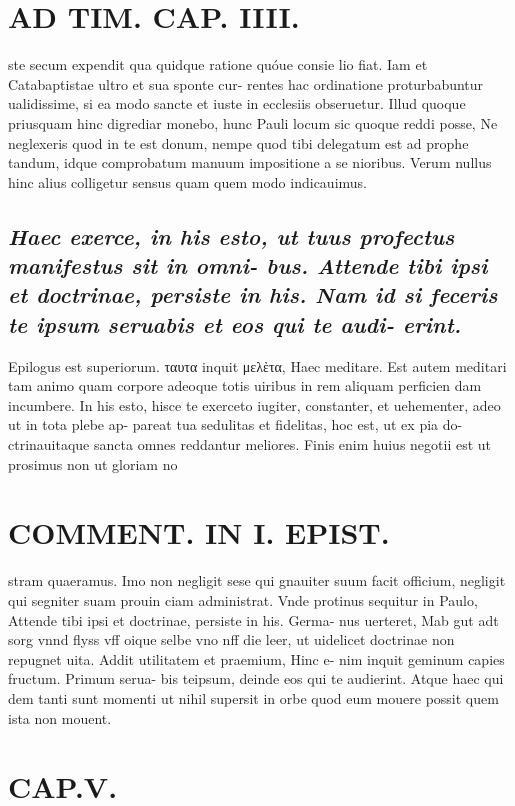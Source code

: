 \documentclass{article}
\begin{document}
\begin{pages}
\section*{AD TIM. CAP. IIII. }
\marginpar{[ p.147 ]}\pstart ste secum expendit qua quidque ratione quóue consie lio fiat. Iam et Catabaptistae ultro et sua sponte cur- rentes hac ordinatione proturbabuntur ualidissime, si ea modo sancte et iuste in ecclesiis obseruetur. Illud quoque priusquam hinc digrediar monebo, hunc Pauli locum sic quoque reddi posse, Ne neglexeris quod in te est donum, nempe quod tibi delegatum est ad prophe tandum, idque comprobatum manuum impositione a se nioribus. Verum nullus hinc alius colligetur sensus quam quem modo indicauimus.  \pend
{}
{}
\subsection*{\textit{Haec exerce, in his esto, ut tuus profectus manifestus sit in omni- bus. Attende tibi ipsi et doctrinae, persiste in his. Nam id si feceris te ipsum seruabis et eos qui te audi- erint. }}\pstart Epilogus est superiorum. ταυτα inquit μελὲτα, Haec meditare. Est autem meditari tam animo quam corpore adeoque totis uiribus in rem aliquam perficien dam incumbere. In his esto, hisce te exerceto iugiter, constanter, et uehementer, adeo ut in tota plebe ap- pareat tua sedulitas et fidelitas, hoc est, ut ex pia do- ctrinauitaque sancta omnes reddantur meliores. Finis enim huius negotii est ut prosimus non ut gloriam no  \pend
\section*{COMMENT. IN I. EPIST. }\pstart stram quaeramus. Imo non negligit sese qui gnauiter suum facit officium, negligit qui segniter suam prouin ciam administrat. Vnde protinus sequitur in Paulo, Attende tibi ipsi et doctrinae, persiste in his. Germa- nus uerteret, Mab gut adt sorg vnnd flyss vff oique selbe vno nff die leer, ut uidelicet doctrinae non repugnet uita. Addit utilitatem et praemium, Hinc e- nim inquit geminum capies fructum. Primum serua- bis teipsum, deinde eos qui te audierint. Atque haec qui dem tanti sunt momenti ut nihil supersit in orbe quod eum mouere possit quem ista non mouent.  \pend
\endnumbering\beginnumbering\section{CAP.V.}
{}

\end{pages}
\end{document}
